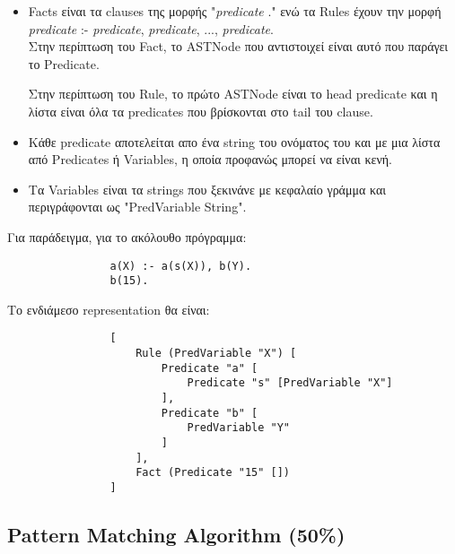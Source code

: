 \documentclass[10pt]{article}
\begin{document}
\begin{itemize}

\item Facts είναι τα clauses της μορφής "\textit{predicate} ." ενώ τα Rules έχουν την μορφή\\


\textit{predicate}  :- \textit{predicate}, \textit{predicate}, ..., \textit{predicate}.\\ 



Στην περίπτωση του Fact, το ASTNode που αντιστοιχεί είναι αυτό που παράγει το Predicate. 

Στην περίπτωση του Rule, το πρώτο ASTNode είναι το head predicate και η λίστα είναι όλα τα predicates που βρίσκονται στο tail του clause.

\item Κάθε predicate αποτελείται απο ένα string του ονόματος του και με μια λίστα από Predicates ή Variables, η οποία προφανώς μπορεί να είναι κενή.

\item Τα Variables είναι τα strings που ξεκινάνε με κεφαλαίο γράμμα και περιγράφονται ως "PredVariable String".

\end{itemize}

Για παράδειγμα, για το ακόλουθο πρόγραμμα:


\begin{verbatim}
                a(X) :- a(s(X)), b(Y).
                b(15).
\end{verbatim}

Το ενδιάμεσο representation θα είναι:

\begin{verbatim}
                [
                    Rule (PredVariable "X") [
                        Predicate "a" [
                            Predicate "s" [PredVariable "X"]
                        ],
                        Predicate "b" [
                            PredVariable "Y"
                        ]
                    ],
                    Fact (Predicate "15" [])
                ]

\end{verbatim}



\subsection*{Pattern Matching Algorithm (50\%)}
\end{document}
